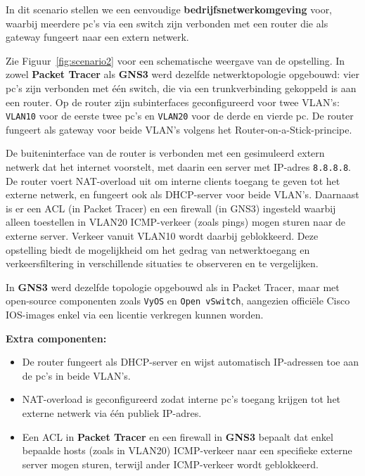 In dit scenario stellen we een eenvoudige \textbf{bedrijfsnetwerkomgeving} voor, waarbij meerdere pc’s via een switch zijn verbonden met een router die als gateway fungeert naar een extern netwerk.

\vspace{0.3cm}

Zie Figuur~\ref{fig:scenario2} voor een schematische weergave van de opstelling. In zowel \textbf{Packet Tracer} als \textbf{GNS3} werd dezelfde netwerktopologie opgebouwd: vier pc’s zijn verbonden met één switch, die via een trunkverbinding gekoppeld is aan een router. Op de router zijn subinterfaces geconfigureerd voor twee VLAN’s: \texttt{VLAN10} voor de eerste twee pc’s en \texttt{VLAN20} voor de derde en vierde pc. De router fungeert als gateway voor beide VLAN’s volgens het Router-on-a-Stick-principe.



\vspace{0.3cm}

De buiteninterface van de router is verbonden met een gesimuleerd extern netwerk dat het internet voorstelt, met daarin een server met IP-adres \texttt{8.8.8.8}. De router voert NAT-overload uit om interne clients toegang te geven tot het externe netwerk, en fungeert ook als DHCP-server voor beide VLAN’s. Daarnaast is er een ACL (in Packet Tracer) en een firewall (in GNS3) ingesteld waarbij alleen toestellen in VLAN20 ICMP-verkeer (zoals pings) mogen sturen naar de externe server. Verkeer vanuit VLAN10 wordt daarbij geblokkeerd. Deze opstelling biedt de mogelijkheid om het gedrag van netwerktoegang en verkeersfiltering in verschillende situaties  te observeren en te vergelijken. 


In \textbf{GNS3} werd dezelfde topologie opgebouwd als in Packet Tracer, maar met open-source componenten zoals \texttt{VyOS} en \texttt{Open vSwitch}, aangezien officiële Cisco IOS-images enkel via een licentie verkregen kunnen worden.


\textbf{Extra componenten:}
\begin{itemize}
    \item De router fungeert als DHCP-server en wijst automatisch IP-adressen toe aan de pc’s in beide VLAN’s.
    \item NAT-overload is geconfigureerd zodat interne pc’s toegang krijgen tot het externe netwerk via één publiek IP-adres.
    \item Een ACL in \textbf{Packet Tracer} en een firewall in \textbf{GNS3} bepaalt dat enkel bepaalde hosts (zoals in VLAN20) ICMP-verkeer naar een specifieke externe server mogen sturen, terwijl ander ICMP-verkeer wordt geblokkeerd.
\end{itemize}

